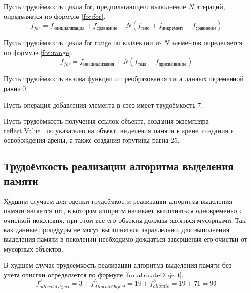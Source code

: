 Пусть трудоёмкость цикла for, предполагающего выполнение $N$ итераций, определяется по формуле \ref{for:for}.
\begin{equation}
	\label{for:for}
	f_{for} = f_{\text{инициализация}} + f_{\text{сравнение}} + N(f_{\text{тело}} + f_{\text{инкремент}} + f_{\text{сравнение}})
\end{equation}
	
Пусть трудоёмкость цикла for range по коллекции из $N$ элементов определяется по формуле \ref{for:range}.
\begin{equation}
	\label{for:range}
	f_{for} = f_{\text{инициализация}} + N(f_{\text{тела}} + f_{\text{присваивание}})
\end{equation}
	
Пусть трудоёмкость вызова функции и преобразования типа данных переменной равна 0.
	
Пусть операция добавления элемента в срез имеет трудоёмкость 7.
	
Пусть трудоёмкость получения ссылок объекта, создания экземпляра reflect.Value~\cite{golang_reflect} по указателю на объект, выделения памяти в арене, создания и освобождения арены, а также создания горутины равна 25.



\subsection*{Трудоёмкость реализации алгоритма выделения памяти}

Худшим случаем для оценки трудоёмкости реализации алгоритма выделения памяти является тот, в котором алгоритм начинает выполняться одновременно с очисткой поколения, при этом все его объекты должны являться мусорными. Так как данные процедуры не могут выполняться параллельно, для выполнения выделения памяти в поколении необходимо дождаться завершения его очистки от мусорных объектов.

В худшем случае трудоёмкость реализации алгоритма выделения памяти без учёта очистки определяется по формуле \ref{for:allocateObject}.
\begin{equation}
	\label{for:allocateObject}
	f_{allocateObject}^{\wedge} = 3 + f_{AllocateObject}^{\wedge} = 19 + f_{allocate}^{\wedge} = 19 + 71 = 90
\end{equation}

